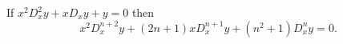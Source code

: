 If $x^{2} D_{x}^{2}y + x D_{x} y + y = 0$ then
\[
x^{2} D_{x}^{n+2} y + (2n + 1)x D_{x}^{n+1} y + (n^{2} + 1) D_{x}^{n} y = 0.
\]


